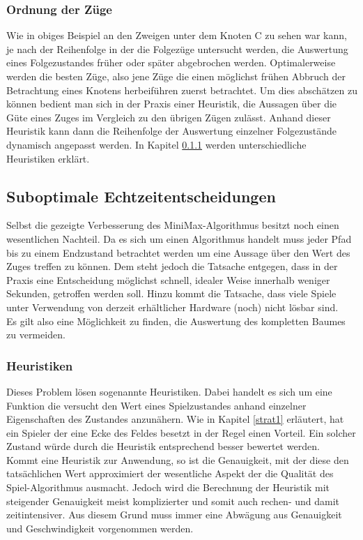 \subsubsection{Ordnung der Züge}
Wie in obiges Beispiel an den Zweigen unter dem Knoten C zu sehen war kann, je nach der Reihenfolge in der die Folgezüge untersucht werden, die Auswertung eines Folgezustandes früher oder später abgebrochen werden. Optimalerweise werden die besten Züge, also jene Züge die einen möglichst frühen Abbruch der Betrachtung eines Knotens herbeiführen zuerst betrachtet. Um dies abschätzen zu können bedient man sich in der Praxis einer Heuristik, die Aussagen über die Güte eines Zuges im Vergleich zu den übrigen Zügen zulässt. Anhand dieser Heuristik kann dann die Reihenfolge der Auswertung einzelner Folgezustände dynamisch angepasst werden. In Kapitel \ref{Heuristiken} werden unterschiedliche Heuristiken erklärt.

\subsection{Suboptimale Echtzeitentscheidungen}
Selbst die gezeigte Verbesserung des MiniMax-Algorithmus besitzt noch einen wesentlichen Nachteil. Da es sich um einen  Algorithmus handelt muss jeder Pfad bis zu einem Endzustand betrachtet werden um eine Aussage über den Wert des Zuges treffen zu können. Dem steht jedoch die Tatsache entgegen, dass in der Praxis eine Entscheidung möglichst schnell, idealer Weise innerhalb weniger Sekunden, getroffen werden soll. Hinzu kommt die Tatsache, dass viele Spiele unter Verwendung von derzeit erhältlicher Hardware (noch) nicht lösbar sind.\\
Es gilt also eine Möglichkeit zu finden, die Auswertung des kompletten Baumes zu vermeiden.

\subsubsection{Heuristiken}
\label{Heuristiken}
Dieses Problem lösen sogenannte Heuristiken. Dabei handelt es sich um eine Funktion die versucht den Wert eines Spielzustandes anhand einzelner Eigenschaften des Zustandes anzunähern. Wie in Kapitel \ref{strat1} erläutert, hat ein Spieler der eine Ecke des Feldes besetzt in der Regel einen Vorteil. Ein solcher Zustand würde durch die Heuristik entsprechend besser bewertet werden.\\
Kommt eine Heuristik zur Anwendung, so ist die Genauigkeit, mit der diese den tatsächlichen Wert approximiert der wesentliche Aspekt der die Qualität des Spiel-Algorithmus ausmacht. Jedoch wird die Berechnung der Heuristik mit steigender Genauigkeit meist komplizierter und somit auch rechen- und damit zeitintensiver. Aus diesem Grund muss immer eine Abwägung aus Genauigkeit und Geschwindigkeit vorgenommen werden. 

